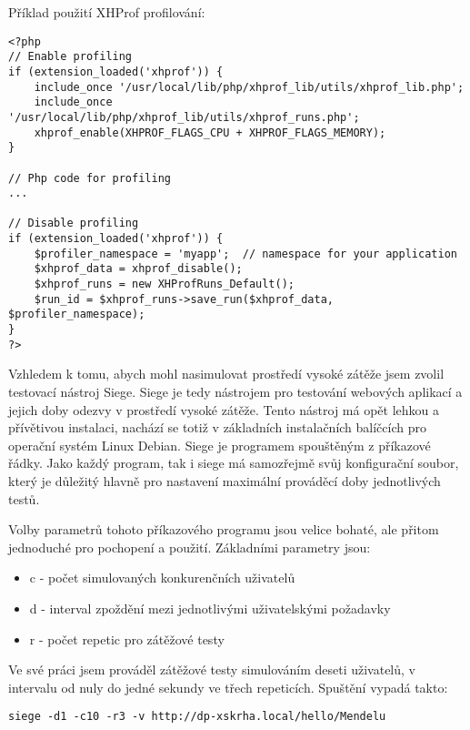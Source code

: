 \documentclass[12pt]{article}
\begin{document}
\newpage
Příklad použití XHProf profilování:
\begin{scriptsize}
\begin{verbatim}
<?php
// Enable profiling
if (extension_loaded('xhprof')) {
    include_once '/usr/local/lib/php/xhprof_lib/utils/xhprof_lib.php';
    include_once '/usr/local/lib/php/xhprof_lib/utils/xhprof_runs.php';
    xhprof_enable(XHPROF_FLAGS_CPU + XHPROF_FLAGS_MEMORY);
}

// Php code for profiling
...

// Disable profiling
if (extension_loaded('xhprof')) {
    $profiler_namespace = 'myapp';  // namespace for your application
    $xhprof_data = xhprof_disable();
    $xhprof_runs = new XHProfRuns_Default();
    $run_id = $xhprof_runs->save_run($xhprof_data, $profiler_namespace);
}
?>
\end{verbatim}
\end{scriptsize}

Vzhledem k tomu, abych mohl nasimulovat prostředí vysoké zátěže jsem zvolil testovací nástroj Siege. Siege je tedy nástrojem pro testování webových aplikací a jejich doby odezvy v prostředí vysoké zátěže. Tento nástroj má opět lehkou a přívětivou instalaci, nachází se totiž v základních instalačních balíčcích pro operační systém Linux Debian. Siege je programem spouštěným z příkazové řádky. Jako každý program, tak i siege má samozřejmě svůj konfigurační soubor, který je důležitý hlavně pro nastavení maximální prováděcí doby jednotlivých testů.

Volby parametrů tohoto příkazového programu jsou velice bohaté, ale přitom jednoduché pro pochopení a použití. Základními parametry jsou:

\begin{itemize}
\item c - počet simulovaných konkurenčních uživatelů
\item d - interval zpoždění mezi jednotlivými uživatelskými požadavky
\item r - počet repetic pro zátěžové testy
\end{itemize}

Ve své práci jsem prováděl zátěžové testy simulováním deseti uživatelů, v intervalu od nuly do jedné sekundy ve třech repeticích. Spuštění vypadá takto:
\begin{scriptsize}
\begin{verbatim}
siege -d1 -c10 -r3 -v http://dp-xskrha.local/hello/Mendelu
\end{verbatim}
\end{scriptsize}
\end{document}

